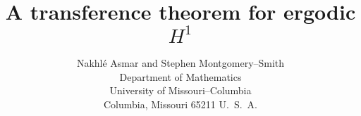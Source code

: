 \setlength\textwidth{6in}
\setlength\oddsidemargin{0.25in}
\topmargin -20mm
\footskip 12mm
\textheight 56pc
\def\Bbb#1{{\mathchoice{\mbox{\bf #1}}{\mbox{\bf #1}}%
{\mbox{$\scriptstyle \bf #1$}}{\mbox{$\scriptscriptstyle \bf #1$}}}}
\def\N{\Bbb N}
\def\R{\Bbb R}
\def\C{\Bbb C}
\def\D{\Bbb D}
\def\Z{\Bbb Z}
\def\T{\Bbb T}
\def\Q{\Bbb Q}
\def\E{\Bbb E}
\def\O{\Omega}
\def\sgn{{\rm sgn}}
\def\supp{{\rm supp}}
\def\cH{{\cal H}}
\def\e{\epsilon}
\def\cA{{\cal A}}
\def\cE{{\cal E}}
\def\cL{{\cal L}}
\def\cI{{\cal I}}
\def\cB{{\cal B}}
\def\cM{{\cal M}}
\def\cT{{\cal T}}
\def\Linfg{L^\infty (G)}
\def\Hinfg{H^\infty (G)}
\def\spec{{\rm spec}}


\title{A transference theorem for 
ergodic $H^1$}
\author{Nakhl\'e Asmar
 and Stephen Montgomery--Smith
\\
Department of Mathematics\\
University of
Missouri--Columbia\\
Columbia, Missouri 65211  U.\ S.\ A.
}
\date{}
\maketitle

